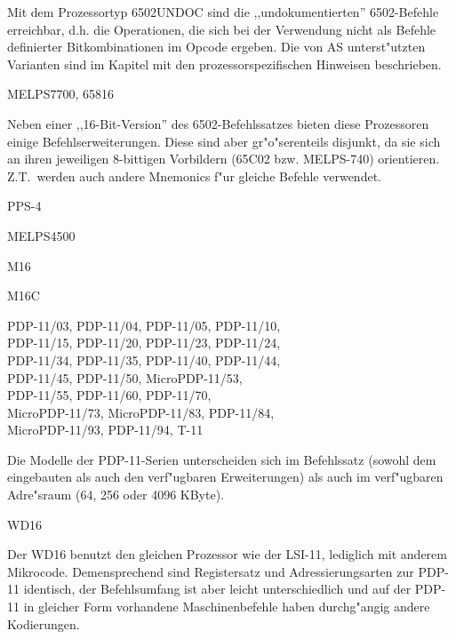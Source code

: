 \documentclass[12pt,a4paper,twoside]{report}
\newcommand{\asname}{AS}
\begin{document}
Mit dem Prozessortyp 6502UNDOC sind die ,,undokumentierten''
6502-Befehle erreichbar, d.h. die Operationen, die sich bei der Verwendung
nicht als Befehle definierter Bitkombinationen im Opcode ergeben.  Die von
\asname{} unterst"utzten Varianten sind im Kapitel mit den prozessorspezifischen
Hinweisen beschrieben.
\begin{cpulist}
   MELPS7700, 65816
\end{cpulist}
Neben einer ,,16-Bit-Version'' des 6502-Befehlssatzes bieten diese
Prozessoren einige Befehlserweiterungen.  Diese sind aber gr"o"serenteils
disjunkt, da sie sich an ihren jeweiligen 8-bittigen Vorbildern (65C02
bzw. MELPS-740) orientieren.  Z.T.~werden auch andere Mnemonics f"ur
gleiche Befehle verwendet.
\begin{cpulist}
   PPS-4
\end{cpulist}
\begin{cpulist}
   MELPS4500
\end{cpulist}
\begin{cpulist}
   M16
\end{cpulist}
\begin{cpulist}
   M16C
\end{cpulist}
\begin{cpulist}
   PDP-11/03, PDP-11/04, PDP-11/05, PDP-11/10, \\
\> PDP-11/15, PDP-11/20, PDP-11/23, PDP-11/24, \\
\> PDP-11/34, PDP-11/35, PDP-11/40, PDP-11/44, \\
\> PDP-11/45, PDP-11/50, MicroPDP-11/53, \\
\> PDP-11/55, PDP-11/60, PDP-11/70, \\
\> MicroPDP-11/73, MicroPDP-11/83, PDP-11/84, \\
\> MicroPDP-11/93, PDP-11/94, T-11
\end{cpulist}
Die Modelle der PDP-11-Serien unterscheiden sich im
Befehlssatz (sowohl dem eingebauten als auch den verf"ugbaren
Erweiterungen) als auch im verf"ugbaren Adre"sraum (64, 256
oder 4096 KByte).
\begin{cpulist}
   WD16
\end{cpulist}
Der WD16 benutzt den gleichen Prozessor wie der LSI-11, 
lediglich mit anderem Mikrocode.  Demensprechend sind
Registersatz und Adressierungsarten zur PDP-11 identisch,
der Befehlsumfang ist aber leicht unterschiedlich und
auf der PDP-11 in gleicher Form vorhandene Maschinenbefehle
haben durchg"angig andere Kodierungen.
\end{document}
